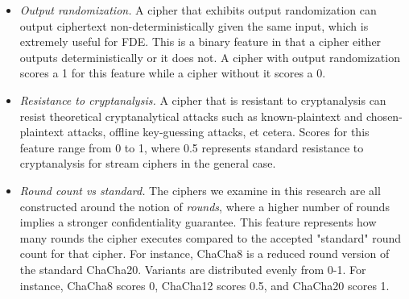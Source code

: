 \begin{itemize}

 \item \emph{Output randomization.} A cipher that exhibits output randomization
 can output ciphertext non-deterministically given the same input, which is
 extremely useful for FDE\@. This is a binary feature in that a cipher either
 outputs deterministically or it does not. A cipher with output randomization
 scores a 1 for this feature while a cipher without it scores a 0.

 \item \emph{Resistance to cryptanalysis.} A cipher that is resistant to
 cryptanalysis can resist theoretical cryptanalytical attacks such as
 known-plaintext and chosen-plaintext attacks, offline key-guessing attacks, et
 cetera. Scores for this feature range from 0 to 1, where 0.5 represents
 standard resistance to cryptanalysis for stream ciphers in the general case\@.

 \item \emph{Round count vs standard.} The ciphers we examine in this research
 are all constructed around the notion of \emph{rounds}, where a higher number
 of rounds implies a stronger confidentiality guarantee. This feature represents
 how many rounds the cipher executes compared to the accepted "standard" round
 count for that cipher. For instance, ChaCha8 is a reduced round version of the
 standard ChaCha20. Variants are distributed evenly from 0-1. For instance,
 ChaCha8 scores 0, ChaCha12 scores 0.5, and ChaCha20 scores 1\@.

\end{itemize}


